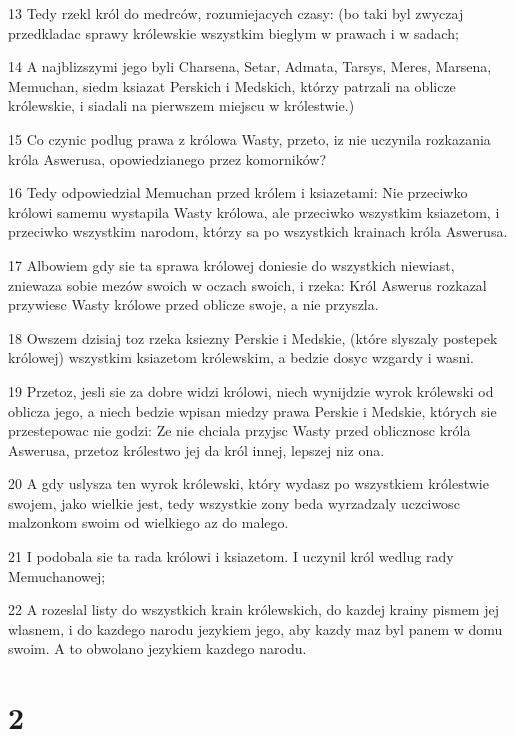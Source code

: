 \par 13 Tedy rzekl król do medrców, rozumiejacych czasy: (bo taki byl zwyczaj przedkladac sprawy królewskie wszystkim bieglym w prawach i w sadach;
\par 14 A najblizszymi jego byli Charsena, Setar, Admata, Tarsys, Meres, Marsena, Memuchan, siedm ksiazat Perskich i Medskich, którzy patrzali na oblicze królewskie, i siadali na pierwszem miejscu w królestwie.)
\par 15 Co czynic podlug prawa z królowa Wasty, przeto, iz nie uczynila rozkazania króla Aswerusa, opowiedzianego przez komorników?
\par 16 Tedy odpowiedzial Memuchan przed królem i ksiazetami: Nie przeciwko królowi samemu wystapila Wasty królowa, ale przeciwko wszystkim ksiazetom, i przeciwko wszystkim narodom, którzy sa po wszystkich krainach króla Aswerusa.
\par 17 Albowiem gdy sie ta sprawa królowej doniesie do wszystkich niewiast, zniewaza sobie mezów swoich w oczach swoich, i rzeka: Król Aswerus rozkazal przywiesc Wasty królowe przed oblicze swoje, a nie przyszla.
\par 18 Owszem dzisiaj toz rzeka ksiezny Perskie i Medskie, (które slyszaly postepek królowej) wszystkim ksiazetom królewskim, a bedzie dosyc wzgardy i wasni.
\par 19 Przetoz, jesli sie za dobre widzi królowi, niech wynijdzie wyrok królewski od oblicza jego, a niech bedzie wpisan miedzy prawa Perskie i Medskie, których sie przestepowac nie godzi: Ze nie chciala przyjsc Wasty przed oblicznosc króla Aswerusa, przetoz królestwo jej da król innej, lepszej niz ona.
\par 20 A gdy uslysza ten wyrok królewski, który wydasz po wszystkiem królestwie swojem, jako wielkie jest, tedy wszystkie zony beda wyrzadzaly uczciwosc malzonkom swoim od wielkiego az do malego.
\par 21 I podobala sie ta rada królowi i ksiazetom. I uczynil król wedlug rady Memuchanowej;
\par 22 A rozeslal listy do wszystkich krain królewskich, do kazdej krainy pismem jej wlasnem, i do kazdego narodu jezykiem jego, aby kazdy maz byl panem w domu swoim. A to obwolano jezykiem kazdego narodu.

\chapter{2}

